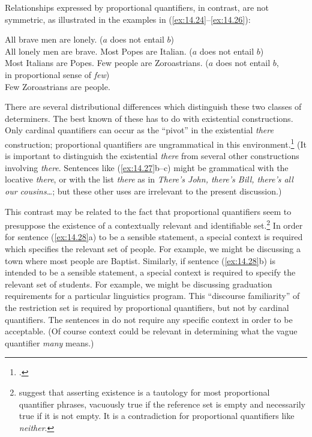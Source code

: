 {Relationships expressed by proportional quantifiers, in contrast, are not symmetric, as illustrated in the examples in (\ref{ex:14.24}--\ref{ex:14.26}):


\ea \label{ex:14.24}
\ea All brave men are lonely. \hfill  ($a$ does not entail $b$)\\
\ex All lonely men are brave.
\z
\ex \label{ex:14.25}
\ea  Most Popes are {Italian}.  \hfill  ($a$ does not entail $b$)\\
\ex Most Italians are Popes.
\z 
\ex \label{ex:14.26}
\ea Few people are Zoroastrians.  \hfill ($a$ does not entail $b$, \\
\hfill in proportional sense of \textit{few})\\
\ex Few Zoroastrians are people.
 \z
\z


There are several distributional differences which distinguish these two classes of determiners. The best known of these has to do with existential constructions. Only cardinal quantifiers can occur as the “pivot” in the existential \textit{there} construction; proportional quantifiers are ungrammatical in this environment.\footnote{\citet{Milsark1977}.} (It is important to distinguish the existential \textit{there} from several other constructions involving \textit{there}. Sentences like (\ref{ex:14.27}b--c) might be grammatical with the locative \textit{there}, or with the list \textit{there} as in \textit{There’s John, there’s Bill, there’s all our cousins…}; but these other uses are irrelevant to the present discussion.)


\ea \label{ex:14.27}
\z
\z


This contrast may be related to the fact that proportional quantifiers seem to presuppose the existence of a contextually relevant and identifiable set.\footnote{\citet{BarwiseCooper1981} suggest that asserting existence is a tautology for most proportional quantifier phrases, vacuously true if the reference set is empty and necessarily true if it is not empty. It is a contradiction for proportional quantifiers like \textit{neither}.} In order for sentence (\ref{ex:14.28}a) to be a sensible statement, a special context is required which specifies the relevant set of people. For example, we might be discussing a town where most people are Baptist. Similarly, if sentence (\ref{ex:14.28}b) is intended to be a sensible statement, a special context is required to specify the relevant set of students. For example, we might be discussing graduation requirements for a particular linguistics program. This “discourse familiarity” of the restriction set is required by proportional quantifiers, but not by cardinal quantifiers. The sentences in  do not require any specific context in order to be acceptable. (Of course context could be relevant in determining what the vague quantifier \textit{many} means.)


}
